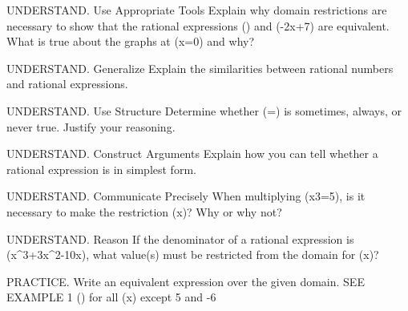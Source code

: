 \documentclass{article}
\newenvironment{practice}[2]{}{}        %
\newcommand{\answer}[1]{}               %
\begin{document}
\begin{practice}{14}{2}
UNDERSTAND. Use Appropriate Tools Explain why domain restrictions are necessary to show that the rational expressions () and (-2x+7) are equivalent. What is true about the graphs at (x=0) and why?
\answer{Sample answer: Domain restrictions are needed because you may not be able to tell just from graphs when two expressions are not equivalent. The graphs of (y=\frac{-6x^2+21x}{3x}) and (y=-2x+7) may look identical, but using the trace feature or table values, (y=\frac{-6x^2+21x}{3x}) is undefined at (x=0), while (y=-2x+7) is equal to 7 at (x=0).}
\end{practice}
\begin{practice}{15}{2}
UNDERSTAND. Generalize Explain the similarities between rational numbers and rational expressions.
\answer{A rational number is the ratio of two integers, while a rational expression is a ratio of two polynomials.}
\end{practice}
\begin{practice}{16}{2}
UNDERSTAND. Use Structure Determine whether (=) is sometimes, always, or never true. Justify your reasoning.
\answer{Never; when you cross multiply, you get (30x+66=30x+55); since (66\neq55), there is no real number (x) for which that equation is true.}
\end{practice}
\begin{practice}{17}{2}
UNDERSTAND. Construct Arguments Explain how you can tell whether a rational expression is in simplest form.
\answer{A rational expression is in simplest form when the numerator and denominator have no common factors other than 1.}
\end{practice}
\begin{practice}{18}{2}
UNDERSTAND. Communicate Precisely When multiplying (\cdot\frac x3=5), is it necessary to make the restriction (x)? Why or why not?
\answer{Yes; even though the factor of (x) was canceled out, the original fractions cannot be undefined, so the restriction is necessary.}
\end{practice}
\begin{practice}{19}{2}
UNDERSTAND. Reason If the denominator of a rational expression is (x^3+3x^2-10x), what value(s) must be restricted from the domain for (x)?
\answer{-5, 0, 2}
\end{practice}
\begin{practice}{20}{1}
PRACTICE. Write an equivalent expression over the given domain. SEE EXAMPLE 1
() for all (x) except 5 and -6
\answer{(\frac{x^3+4x^2-12x}{x^2+x-30})}
\end{practice}
\end{document}
